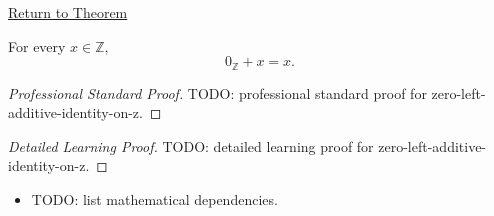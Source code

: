 \newpage
{}
\label{prf:zero-left-additive-identity-on-z}

\begin{remark*}[Return]
\hyperref[thm:zero-left-additive-identity-on-z]{Return to Theorem}
\end{remark*}

\begin{theorem*}
For every $x\in\mathbb{Z}$,
\[
0_{\mathbb{Z}}+x=x.
\]
\end{theorem*}

\begin{proof}[Professional Standard Proof]
\LRAProofBodyStart
TODO: professional standard proof for zero-left-additive-identity-on-z.
\end{proof}

\begin{proof}[Detailed Learning Proof]
\LRAProofBodyStart
TODO: detailed learning proof for zero-left-additive-identity-on-z.
\end{proof}

\begin{remark*}
\end{remark*}

\begin{dependencies}
\begin{itemize}
  \item TODO: list mathematical dependencies.
\end{itemize}
\end{dependencies}

\clearpage
